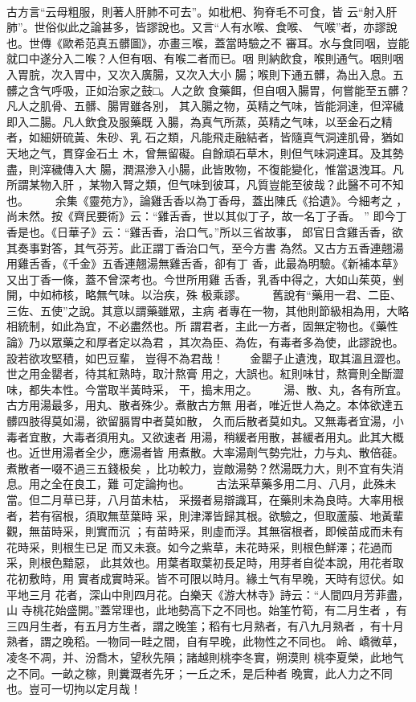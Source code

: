 \documentclass{ctexart}
\begin{document}
\paragraph{}
古方言``云母粗服，則著人肝肺不可去''。如枇杷、狗脊毛不可食，皆 云``射入肝肺''。世俗似此之論甚多，皆謬說也。又言``人有水喉、食喉、 气喉''者，亦謬說也。世傳《歐希范真五髒圖》，亦畫三喉，蓋當時驗之不 審耳。水与食同咽，豈能就口中遂分入二喉？人但有咽、有喉二者而已。咽 則納飲食，喉則通气。咽則咽入胃脘，次入胃中，又次入廣腸，又次入大小 腸；喉則下通五髒，為出入息。五髒之含气呼吸，正如治家之鼓□。人之飲 食藥餌，但自咽入腸胃，何嘗能至五髒？凡人之肌骨、五髒、腸胃雖各別， 其入腸之物，英精之气味，皆能洞達，但滓穢即入二腸。凡人飲食及服藥既 入腸，為真气所蒸，英精之气味，以至金石之精者，如細妍硫黃、朱砂、乳 石之類，凡能飛走融結者，皆隨真气洞達肌骨，猶如天地之气，貫穿金石土 木，曾無留礙。自餘頑石草木，則但气味洞達耳。及其勢盡，則滓穢傳入大 腸，潤濕滲入小腸，此皆敗物，不復能變化，惟當退洩耳。凡所謂某物入肝 ，某物入腎之類，但气味到彼耳，凡質豈能至彼哉？此醫不可不知也。 　　余集《靈苑方》，論雞舌香以為丁香母，蓋出陳氏《拾遺》。今細考之 ，尚未然。按《齊民要術》云：``雞舌香，世以其似丁子，故一名丁子香。 '' 即今丁香是也。《日華子》云：``雞舌香，治口气。''所以三省故事， 郎官日含雞舌香，欲其奏事對答，其气芬芳。此正謂丁香治口气，至今方書 為然。又古方五香連翹湯用雞舌香，《千金》五香連翹湯無雞舌香，卻有丁 香，此最為明驗。《新補本草》又出丁香一條，蓋不曾深考也。今世所用雞 舌香，乳香中得之，大如山茱萸，剉開，中如柿核，略無气味。以治疾，殊 极乘謬。 　　舊說有``藥用一君、二臣、三佐、五使''之說。其意以謂藥雖眾，主病 者專在一物，其他則節級相為用，大略相統制，如此為宜，不必盡然也。所 謂君者，主此一方者，固無定物也。《藥性論》乃以眾藥之和厚者定以為君 ，其次為臣、為佐，有毒者多為使，此謬說也。設若欲攻堅積，如巴豆輩， 豈得不為君哉！ 　　金罌子止遺洩，取其溫且澀也。世之用金罌者，待其紅熟時，取汁熬膏 用之，大誤也。紅則味甘，熬膏則全斷澀味，都失本性。今當取半黃時采， 干，搗末用之。 　　湯、散、丸，各有所宜。古方用湯最多，用丸、散者殊少。煮散古方無 用者，唯近世人為之。本体欲達五髒四肢得莫如湯，欲留膈胃中者莫如散， 久而后散者莫如丸。又無毒者宜湯，小毒者宜散，大毒者須用丸。又欲速者 用湯，稍緩者用散，甚緩者用丸。此其大概也。近世用湯者全少，應湯者皆 用煮散。大率湯劑气勢完壯，力与丸、散倍蓰。煮散者一啜不過三五錢极矣 ，比功較力，豈敵湯勢？然湯既力大，則不宜有失消息。用之全在良工，難 可定論拘也。 　　古法采草藥多用二月、八月，此殊未當。但二月草已芽，八月苗未枯， 采掇者易辯識耳，在藥則未為良時。大率用根者，若有宿根，須取無莖葉時 采，則津澤皆歸其根。欲驗之，但取蘆菔、地黃輩觀，無苗時采，則實而沉 ；有苗時采，則虛而浮。其無宿根者，即候苗成而未有花時采，則根生已足 而又未衰。如今之紫草，未花時采，則根色鮮澤；花過而采，則根色黯惡， 此其效也。用葉者取葉初長足時，用芽者自從本說，用花者取花初敷時，用 實者成實時采。皆不可限以時月。緣土气有早晚，天時有愆伏。如平地三月 花者，深山中則四月花。白樂天《游大林寺》詩云：``人間四月芳菲盡，山 寺桃花始盛開。''蓋常理也，此地勢高下之不同也。始筀竹筍，有二月生者 ，有三四月生者，有五月方生者，謂之晚筀；稻有七月熟者，有八九月熟者 ，有十月熟者，謂之晚稻。一物同一畦之間，自有早晚，此物性之不同也。 岭、嶠微草，凌冬不凋，并、汾喬木，望秋先隕；諸越則桃李冬實，朔漠則 桃李夏榮，此地气之不同。一畝之稼，則糞溉者先牙；一丘之禾，是后种者 晚實，此人力之不同也。豈可一切拘以定月哉！ 
\end{document}
